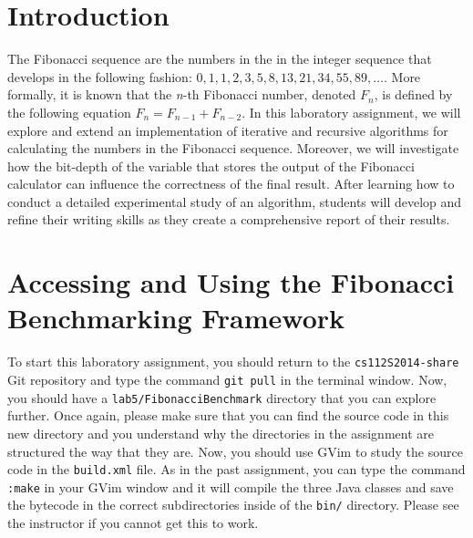 


\usepackage[compact]{titlesec}


\section*{Introduction}

The Fibonacci sequence are the numbers in the in the integer sequence that develops in the following fashion: $0, 1, 1,
2, 3, 5, 8, 13, 21, 34, 55, 89, \ldots$. More formally, it is known that the {\em n}-th Fibonacci number, denoted $F_n$,
is defined by the following equation $F_n = F_{n-1} + F_{n-2}$. In this laboratory assignment, we will explore and
extend an implementation of iterative and recursive algorithms for calculating the numbers in the Fibonacci sequence.
Moreover, we will investigate how the bit-depth of the variable that stores the output of the Fibonacci calculator can
influence the correctness of the final result. After learning how to conduct a detailed experimental study of an
algorithm, students will develop and refine their writing skills as they create a comprehensive report of their results.

\section*{Accessing and Using the Fibonacci Benchmarking Framework}

\begin{sloppypar} To start this laboratory assignment, you should return to the {\tt cs112S2014-share} Git repository
  and type the command {\tt git pull} in the terminal window.  Now, you should have a {\tt lab5/FibonacciBenchmark}
  directory that you can explore further.  Once again, please make sure that you can find the source code in this new
  directory and you understand why the directories in the assignment are structured the way that they are. Now, you
  should use GVim to study the source code in the {\tt build.xml} file.  As in the past assignment, you can type the
  command {\tt :make} in your GVim window and it will compile the three Java classes and save the bytecode in the
  correct subdirectories inside of the {\tt bin/} directory.  Please see the instructor if you cannot get this to work.
\end{sloppypar}

